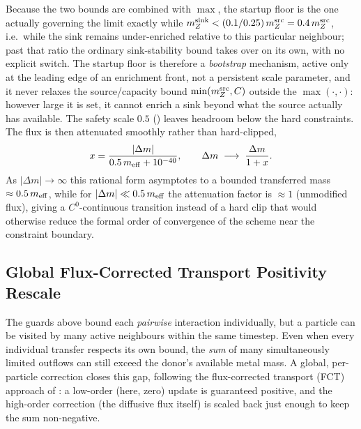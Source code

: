 \begin{enumerate}
        Because the two bounds are combined with $\max$, the startup
        floor is the one actually governing the limit exactly while
        $m_Z^{\rm sink} < (0.1/0.25)\,m_Z^{\rm src} = 0.4\,
        m_Z^{\rm src}$, i.e.\ while the sink remains under-enriched
        relative to this particular neighbour; past that ratio the
        ordinary sink-stability bound takes over on its own, with no
        explicit switch. The startup floor is therefore a
        \emph{bootstrap} mechanism, active only at the leading edge of
        an enrichment front, not a persistent scale parameter, and it
        never relaxes the source/capacity bound $\min(m_Z^{\rm src},
        C)$ outside the $\max(\cdot,\cdot)$: however large it is set,
        it cannot enrich a sink beyond what the source actually has
        available. The safety scale $0.5$
        () leaves headroom below the
        hard constraints. The flux is then attenuated smoothly rather
        than hard-clipped,
        \begin{equation}
          x = \frac{|\Delta m|}{0.5\, m_{\rm eff} + 10^{-40}} , \qquad
          \Delta m \;\longrightarrow\; \frac{\Delta m}{1+x} .
        \end{equation}
        As $|\Delta m|\to\infty$ this rational form asymptotes to a
        bounded transferred mass $\approx 0.5\,m_{\rm eff}$, while for
        $|\Delta m|\ll 0.5\,m_{\rm eff}$ the attenuation factor is
        $\approx 1$ (unmodified flux), giving a $C^0$-continuous
        transition instead of a hard clip that would otherwise reduce
        the formal order of convergence of the scheme near the
        constraint boundary.
\end{enumerate}

\subsection{Global Flux-Corrected Transport Positivity Rescale}
\label{sec:fct}

The guards above bound each \emph{pairwise} interaction individually, but
a particle can be visited by many active neighbours within the same
timestep. Even when every individual transfer respects its own bound, the
\emph{sum} of many simultaneously limited outflows can still exceed the
donor's available metal mass. A global, per-particle correction closes
this gap, following the flux-corrected transport (FCT) approach of
\citet{Zalesak1979}: a low-order (here, zero) update is guaranteed
positive, and the high-order correction (the diffusive flux itself) is
scaled back just enough to keep the sum non-negative.

